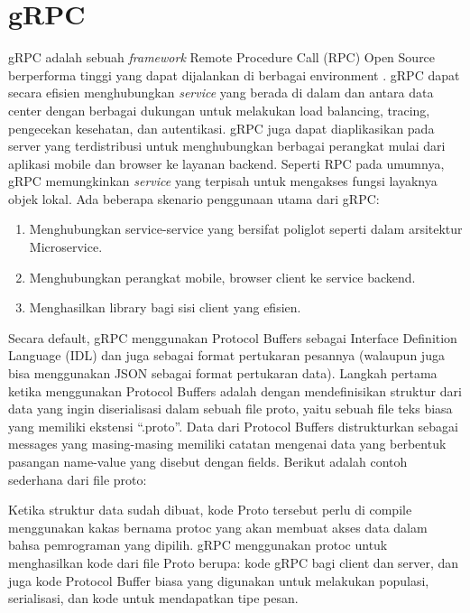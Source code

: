 
\section{gRPC}
gRPC adalah sebuah \textit{framework} Remote Procedure Call (RPC) Open Source berperforma tinggi yang dapat dijalankan di berbagai environment \citep{grpc}.
gRPC dapat secara efisien menghubungkan \textit{service} yang berada di dalam dan antara data center dengan berbagai dukungan untuk melakukan load balancing, tracing, pengecekan kesehatan, dan autentikasi.
gRPC juga dapat diaplikasikan pada server yang terdistribusi untuk menghubungkan berbagai perangkat mulai dari aplikasi mobile dan browser ke layanan backend.
Seperti RPC pada umumnya, gRPC memungkinkan \textit{service} yang terpisah untuk mengakses fungsi layaknya objek lokal. Ada beberapa skenario penggunaan utama dari gRPC:
\begin{enumerate}
	\item Menghubungkan service-service yang bersifat poliglot seperti dalam arsitektur Microservice.
	\item Menghubungkan perangkat mobile, browser client ke service backend.
	\item Menghasilkan library bagi sisi client yang efisien.
\end{enumerate}

Secara default, gRPC menggunakan Protocol Buffers sebagai Interface Definition Language (IDL) dan juga sebagai format pertukaran pesannya (walaupun juga bisa menggunakan JSON sebagai format pertukaran data).
Langkah pertama ketika menggunakan Protocol Buffers adalah dengan mendefinisikan struktur dari data yang ingin diserialisasi dalam sebuah file proto, yaitu sebuah file teks biasa yang memiliki ekstensi “.proto”.
Data dari Protocol Buffers distrukturkan sebagai messages yang masing-masing memiliki catatan mengenai data yang berbentuk pasangan name-value yang disebut dengan fields.
Berikut adalah contoh sederhana dari file proto:


Ketika struktur data sudah dibuat, kode Proto tersebut perlu di compile menggunakan kakas bernama protoc yang akan membuat akses data dalam bahsa pemrograman yang dipilih.
gRPC menggunakan protoc untuk menghasilkan kode dari file Proto berupa: kode gRPC bagi client dan server, dan juga kode Protocol Buffer biasa yang digunakan untuk melakukan populasi, serialisasi, dan kode untuk mendapatkan tipe pesan.


